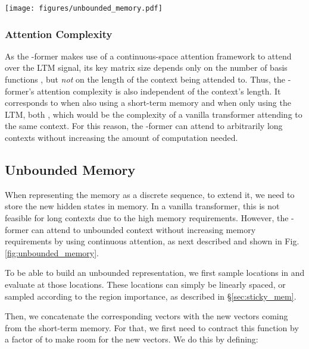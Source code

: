 \documentclass[11pt]{article}
\begin{document}
\begin{figure*}[t]
    \centering
    \texttt{[image: figures/unbounded\_memory.pdf]}
    \caption{Diagram of the unbounded memory update procedure. This is performed in parallel for each embedding dimension, and repeated throughout the input sequence. We propose two alternatives to select the positions used for the function evaluation: linearly spaced or sticky memories.}
    \label{fig:unbounded_memory}
\end{figure*}

\subsubsection{Attention Complexity}
\label{sec:complexity}
As the -former makes use of a continuous-space attention framework \citep{martins2020sparse} to attend over the LTM signal, its key matrix size  depends only on the number of basis functions , but \textit{not} on the length of the context being attended to. Thus, the \mbox{-former's} attention complexity is also independent of the context's length. 
It corresponds to   when also using a short-term memory and  when only using the LTM, both , which would be the complexity of a vanilla transformer attending to the same context. 
For this reason, the -former can attend to arbitrarily long contexts without increasing the amount of computation needed.


\subsection{Unbounded Memory}
\label{sec:unbounded_memory}

When representing the memory as a discrete sequence, to extend it, we need to store the new hidden states in memory. In a vanilla transformer, this is not feasible for long contexts due to the high memory requirements.
However, the -former can attend to unbounded context without increasing memory requirements by using continuous attention, as next described and shown in Fig. \ref{fig:unbounded_memory}. 

To be able to build an unbounded representation, we first sample  locations in  and evaluate  at those locations. These locations can simply be linearly spaced, or sampled according to the region importance, as described in \S\ref{sec:sticky_mem}.

Then, we concatenate the corresponding vectors with the new vectors coming from the short-term memory. 
For that, we first need to contract this function by a factor of  to make room for the new vectors. We do this by defining: 
\end{document}
